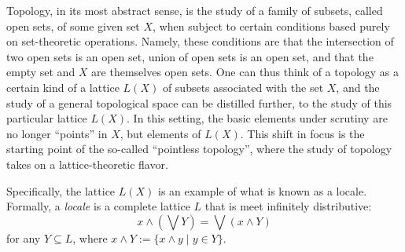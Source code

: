 \documentclass[12pt]{article}
\begin{document}
Topology, in its most abstract sense, is the study of a family of subsets, called open sets, of some given set $X$, when subject to certain conditions based purely on set-theoretic operations.  Namely, these conditions are that the intersection of two open sets is an open set, union of open sets is an open set, and that the empty set and $X$ are themselves open sets.  One can thus think of a topology as a certain kind of a lattice $L(X)$ of subsets associated with the set $X$, and the study of a general topological space can be distilled further, to the study of this particular lattice $L(X)$.  In this setting, the basic elements under scrutiny are no longer ``points'' in $X$, but elements of $L(X)$.  This shift in focus is the starting point of the so-called ``pointless topology'', where the study of topology takes on a lattice-theoretic flavor.

Specifically, the lattice $L(X)$ is an example of what is known as a locale.  Formally, a \emph{locale} is a complete lattice $L$ that is meet infinitely distributive: $$x\wedge (\bigvee Y)=\bigvee (x\wedge Y)$$
for any $Y\subseteq L$, where $x\wedge Y:=\lbrace x\wedge y\mid y\in Y\rbrace$.
\end{document}
